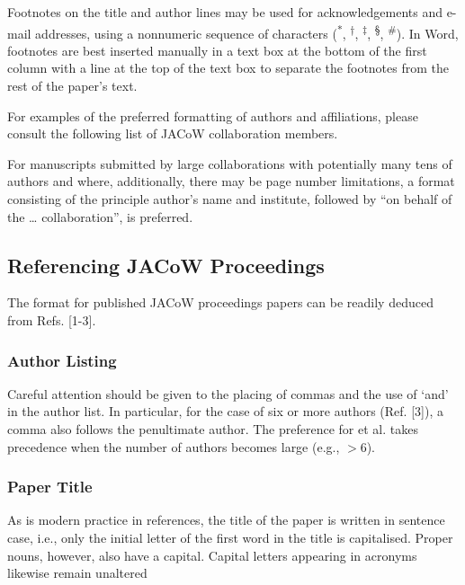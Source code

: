 \documentclass[a4paper,
              ]{jacow}
\begin{document}
Footnotes on the title and author lines may be used for
acknowledgements and e-mail addresses, using a nonnumeric
sequence of characters (\textsuperscript{*}, \textsuperscript{†}, 
\textsuperscript{‡}, \textsuperscript{§}, \textsuperscript{\#}). In Word,
footnotes are best inserted manually in a text box at the
bottom of the first column with a line at the top of the text
box to separate the footnotes from the rest of the paper’s
text.

For examples of the preferred formatting of authors and
affiliations, please consult the following list of JACoW
collaboration members.

For manuscripts submitted by large collaborations with
potentially many tens of authors and where, additionally,
there may be page number limitations, a format consisting
of the principle author’s name and institute, followed by
“on behalf of the … collaboration”, is preferred.


\clearpage
%
%
{}

\clearpage



\subsection{Referencing JACoW Proceedings}

The format for published JACoW proceedings papers
can be readily deduced from Refs. [1-3].

\subsubsection{Author Listing} Careful attention should be given to the
placing of commas and the use of ‘and’ in the author list.
In particular, for the case of six or more authors
(Ref. [3]), a comma also follows the penultimate author.
The preference for et al. takes precedence when the number
of authors becomes large (e.g., $>$6).

\subsubsection{Paper Title} As is modern practice in references, the title
of the paper is written in sentence case, i.e., only the
initial letter of the first word in the title is capitalised.
Proper nouns, however, also have a capital. Capital letters
appearing in acronyms likewise remain unaltered
\end{document}
